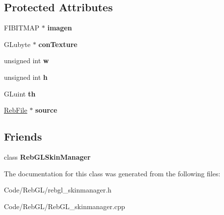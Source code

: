 \subsection*{Protected Attributes}
\begin{DoxyCompactItemize}
\item 
F\+I\+B\+I\+T\+M\+AP $\ast$ {\bfseries imagen}\hypertarget{class_reb_texture_a98c83121edcf72cd6b9cc5e5342b4323}{}\label{class_reb_texture_a98c83121edcf72cd6b9cc5e5342b4323}

\item 
G\+Lubyte $\ast$ {\bfseries con\+Texture}\hypertarget{class_reb_texture_af7cc75b41d41dbf351b52cb41e29af53}{}\label{class_reb_texture_af7cc75b41d41dbf351b52cb41e29af53}

\item 
unsigned int {\bfseries w}\hypertarget{class_reb_texture_a35fb42ace6f1a8c9e2983c2b76307144}{}\label{class_reb_texture_a35fb42ace6f1a8c9e2983c2b76307144}

\item 
unsigned int {\bfseries h}\hypertarget{class_reb_texture_acdbdb75f1967d1487d2b52567822693e}{}\label{class_reb_texture_acdbdb75f1967d1487d2b52567822693e}

\item 
G\+Luint {\bfseries th}\hypertarget{class_reb_texture_ad6b327c84c5ad473923d89d0fda778e5}{}\label{class_reb_texture_ad6b327c84c5ad473923d89d0fda778e5}

\item 
\hyperlink{class_reb_file}{Reb\+File} $\ast$ {\bfseries source}\hypertarget{class_reb_texture_abd33954f20757fd3c35c9f1abd46d2cc}{}\label{class_reb_texture_abd33954f20757fd3c35c9f1abd46d2cc}

\end{DoxyCompactItemize}
\subsection*{Friends}
\begin{DoxyCompactItemize}
\item 
class {\bfseries Reb\+G\+L\+Skin\+Manager}\hypertarget{class_reb_texture_aaf243e541dba94d3093b25d6ae5511b0}{}\label{class_reb_texture_aaf243e541dba94d3093b25d6ae5511b0}

\end{DoxyCompactItemize}


The documentation for this class was generated from the following files\+:\begin{DoxyCompactItemize}
\item 
Code/\+Reb\+G\+L/rebgl\+\_\+skinmanager.\+h\item 
Code/\+Reb\+G\+L/Reb\+G\+L\+\_\+skinmanager.\+cpp\end{DoxyCompactItemize}
